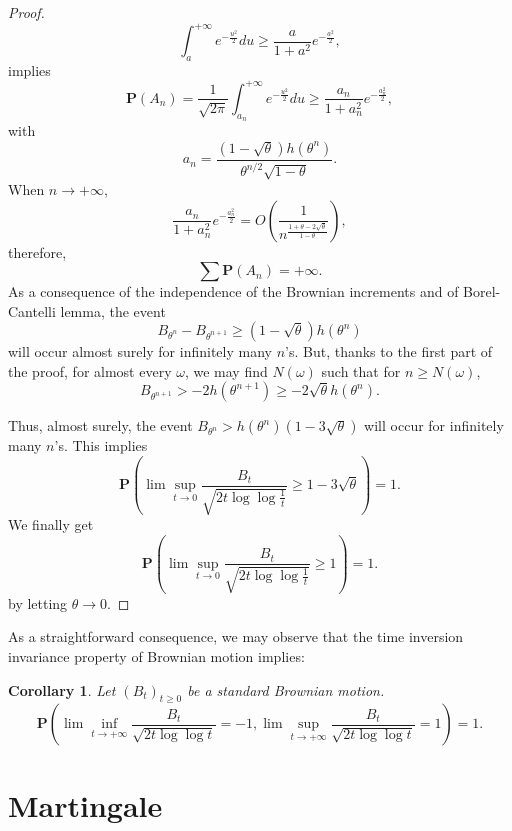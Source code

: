 \documentclass[twoside, 12pt]{book}
\numberwithin{equation}{chapter}
\newtheorem{corollary}[theorem]{Corollary}
\def\mN{{\mathbb N}}
\def\mR{{\mathbb R}}
\def\bP{{\mathbf P}}
\def\bT{{\mathbf T}}
\def\ge{\geqslant}
\begin{document}
\begin{proof}
		$$
		\int_{a}^{+\infty} e^{-\frac{u^2}{2}}du \ge \frac{a}{1+a^2}e^{-\frac{a^2}{2}},  
		$$
		implies
		$$
		\bP  (A_n)=\frac{1}{\sqrt{2\pi}}\int_{a_n}^{+\infty}e^{-\frac{u^2}{2}}du  \ge \frac{a_n}{1+a_n^2}e^{-\frac{a_n^2}{2}},  
		$$
		with
		$$
		a_n=\frac{(1-\sqrt{\theta})h(\theta^n)}{\theta^{n/2} \sqrt{1-\theta}}.  
		$$
		When $n \to +\infty$,
		$$
		\frac{a_n}{1+a_n^2} e^{-\frac{a_n^2}{2}}=O\left(\frac{1}{n^{\frac{1+\theta-2\sqrt{\theta}}{1-\theta}}}\right),  
		$$
		therefore,
		$$
		\sum \bP  (A_n)=+\infty.  
		$$
		As a consequence of the independence of the Brownian increments and of Borel-Cantelli lemma, the event
		$$
		B_{\theta^n}-B_{\theta^{n+1}} \ge (1-\sqrt{\theta})h(\theta^n)  
		$$
		will occur almost surely for infinitely many $n$'s. But, thanks to the first part of the proof, for almost every $\omega$, we may find $N(\omega)$ such that for $n \ge N(\omega)$,
		$$
		B_{\theta^{n+1}}>-2h(\theta^{n+1})\ge-2\sqrt{\theta} h(\theta^n).  
		$$
		
		Thus, almost surely, the event $B_{\theta^n} >h(\theta^n)(1-3\sqrt{\theta})$ will occur for infinitely many $n$'s. This implies
		$$
		\bP \left( \lim \sup_{t \rightarrow 0} \frac{B_{t}}{\sqrt{2t \log  \log  \frac{1}{t}}} \ge 1-3\sqrt{\theta} \right)=1.  
		$$
		We finally get
		\[
		\bP \left( \lim \sup_{t \rightarrow 0} \frac{B_{t}}{\sqrt{2t \log  \log  \frac{1}{t}}} \ge 1 \right)=1.  
		\]
		by letting $\theta \to 0$. 
	\end{proof}
	As a straightforward consequence, we may observe that the time inversion invariance property of Brownian motion implies: 
	\begin{corollary}
		Let $(B_t)_{t\ge 0}$ be a standard Brownian motion.
		\[ 
		\bP \left( \lim \inf_{t \rightarrow +\infty} \frac{B_{t}}{\sqrt{2t \log  \log  t}} =-1,\lim  \sup_{t \rightarrow +\infty} \frac{B_{t}}{\sqrt{2t \log  \log  t}} =1\right)=1.
		\]
	\end{corollary}
	
	
	\section{Martingale}
	
	
	
	
\end{document}
